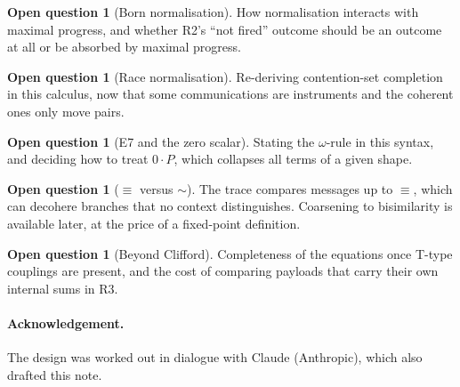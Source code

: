 \documentclass[11pt,a4paper]{article}
\theoremstyle{plain}
\theoremstyle{definition}
\newtheorem{question}[theorem]{Open question}
\theoremstyle{remark}
\newcommand{\scong}{\equiv}
\begin{document}
\begin{question}[Born normalisation]
How normalisation interacts with maximal progress, and whether R2's
``not fired'' outcome should be an outcome at all or be absorbed by maximal
progress.
\end{question}

\begin{question}[Race normalisation]
Re-deriving contention-set completion \cite{GWv6} in this calculus, now that
some communications are instruments and the coherent ones only move pairs.
\end{question}

\begin{question}[E7 and the zero scalar]\label{q:e7}
Stating the $\omega$-rule in this syntax, and deciding how to treat $0\cdot P$,
which collapses all terms of a given shape.
\end{question}

\begin{question}[$\scong$ versus $\sim$]\label{q:sim}
The trace compares messages up to $\scong$, which can decohere branches that no
context distinguishes. Coarsening to bisimilarity is available later, at the
price of a fixed-point definition.
\end{question}

\begin{question}[Beyond Clifford]
Completeness of the equations once T-type couplings are present, and the cost
of comparing payloads that carry their own internal sums in R3.
\end{question}

\paragraph{Acknowledgement.} The design was worked out in dialogue with Claude
(Anthropic), which also drafted this note.
\end{document}
